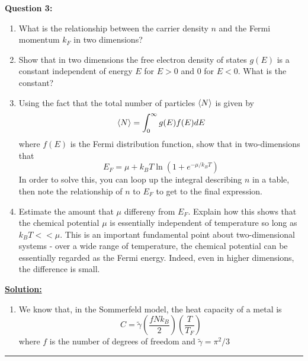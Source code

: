 \documentclass[11pt]{article}
\begin{document}
\begin{bluebox}
  \textbf{Question 3:} 
  \begin{enumerate}[label=(\alph*)]
    \item What is the relationship between the carrier density $n$ and the Fermi momentum $k_F$ in two dimensions? 
    \item Show that in two dimensions the free electron density of states $g(E)$ is a constant independent of energy $E$ for $E > 0$ and 0 for $E < 0$. What is the constant? 
    \item Using the fact that the total number of particles $\langle N \rangle$ is given by $$ \langle N \rangle = \int_{0}^{\infty} g(E) f(E) dE  $$ where $f(E)$ is the Fermi distribution function, show that in two-dimensions that $$ E_F = \mu + k_B T \ln\left( 1 + e^{-\mu / k_B T} \right) $$ In order to solve this, you can loop up the integral describing $n$ in a table, then note the relationship of $n$ to $E_F$ to get to the final expression.
    \item Estimate the amount that $\mu$ differeny from $E_F$. Explain how this shows that the chemical potential $\mu$ is essentially independent of temperature so long as $k_B T << \mu$. This is an important fundamental point about two-dimensional systems - over a wide range of temperature, the chemical potential can be essentially regarded as the Fermi energy. Indeed, even in higher dimensions, the difference is small.
  \end{enumerate}
\end{bluebox}

\vskip 0.5cm
\textbf{\underline{Solution:}}

\begin{enumerate}
  \item We know that, in the Sommerfeld model, the heat capacity of a metal is $$ C = \tilde{\gamma} \left( \frac{f N k_B}{2} \right) \left( \frac{T}{T_F} \right) $$ where $f$ is the number of degrees of freedom and $\tilde{\gamma} = \pi^2/3$
\end{enumerate}

\vskip 0.5cm
\hrule
\pagebreak

















% 
\end{document}
